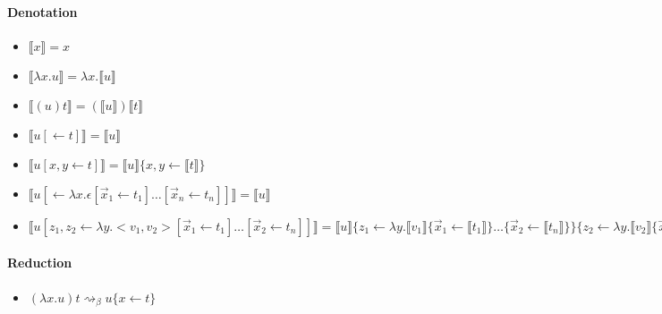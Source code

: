 \documentclass[a4paper]{article}
\begin{document}
\paragraph{Denotation}
\begin{itemize}
 \item $\llbracket x\rrbracket=x$
 \item $\llbracket\lambda x.u\rrbracket=\lambda x.\llbracket u\rrbracket$
 \item $\llbracket(u)t\rrbracket = (\llbracket u\rrbracket)\llbracket t\rrbracket$
 \item $\llbracket u[\leftarrow t]\rrbracket = \llbracket u\rrbracket$
 \item $\llbracket u[x,y\leftarrow t]\rrbracket = \llbracket u\rrbracket\{x,y\leftarrow\llbracket t\rrbracket\}$
 \item $\llbracket u[\leftarrow \lambda x.\epsilon[\vec x_1\leftarrow t_1]\dots[\vec x_n\leftarrow t_n]]\rrbracket = \llbracket u\rrbracket$
 \item $\llbracket u[z_1,z_2\leftarrow \lambda y.<v_1,v_2>[\vec x_1\leftarrow t_1]\dots[\vec x_2\leftarrow t_n]]\rrbracket=\llbracket u\rrbracket\{z_1\leftarrow \lambda y.\llbracket v_1\rrbracket\{\vec x_1\leftarrow \llbracket t_1\rrbracket\}\dots\{\vec x_2\leftarrow \llbracket t_n\rrbracket\}\}\{z_2\leftarrow \lambda y.\llbracket v_2\rrbracket\{\vec x_1\leftarrow \llbracket t_1\rrbracket\}\dots\{\vec x_2\leftarrow \llbracket t_n\rrbracket\}\}$
\end{itemize}

\paragraph{Reduction}

\begin{itemize}
 \item $(\lambda x.u)t \rightsquigarrow_\beta u\{x\leftarrow t\}$
\end{itemize}
\end{document}
